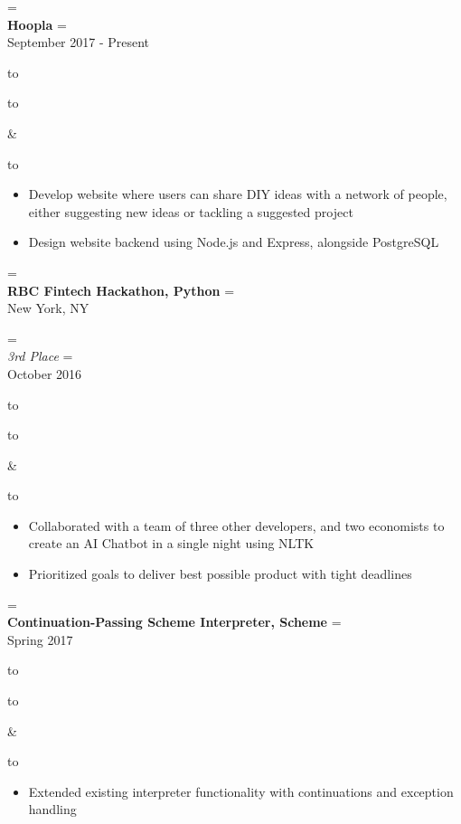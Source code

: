 \documentclass{article}
\newcommand{\appendtotoks}[2]{%
  #1=\expandafter{\the#1#2}%
}
\def\gobble#1{}
\def\gobblefirst#1{%
  #1\expandafter\expandafter\expandafter{\expandafter\gobble\the#1}}
\newcommand{\sectionTitle}[1]{{\Large #1} \vspace{4pt}}
\newenvironment{resumesection}[1]
  {\sectionTitle{#1}}
	{\vspace{10pt}}
\newcommand{\placeStyle}[1]{\textbf{#1}}
\newcommand{\positionStyle}[1]{\textit{#1}}
\newenvironment{newplace}
  {
    \newtoks\leftToks
    \newtoks\rightToks
    \newcommand{\placerow}[2]{%
      \appendtotoks{\leftToks}{\\\placeStyle{##1}}%
      \appendtotoks{\rightToks}{\\##2}}
    \newcommand{\jobrow}[2]{%
      \appendtotoks{\leftToks}{\\\positionStyle{##1}}%
      \appendtotoks{\rightToks}{\\##2}}
    \newcommand{\plainrow}[2]{%
      \appendtotoks{\leftToks}{\\##1}%
      \appendtotoks{\rightToks}{\\##2}}
    \setlength{\tabcolsep}{0pt}%
  }
  {%
    \begin{tabu} to \linewidth [h!]{X[65,l]X[35,r]}
      \begin{tabu} to \linewidth {X}
        \gobblefirst\leftToks
        \the\leftToks
      \end{tabu}
      &
      \begin{tabu} to \linewidth {X[r]}
        \gobblefirst\rightToks
        \the\rightToks
      \end{tabu}
    \end{tabu}%
  }
\newenvironment{bullets}
	{\begin{itemize}[noitemsep, topsep=0pt]}
	{\end{itemize}}
\begin{document}
\begin{resumesection}{Projects}


\begin{newplace}
  \placerow{Hoopla}{September 2017 - Present}
\end{newplace}

\begin{bullets}
  \item Develop website where users can share DIY ideas with a network
        of people, either suggesting new ideas or tackling a suggested
        project 
  \item Design website backend using Node.js and Express, alongside
        PostgreSQL 
\end{bullets}


\begin{newplace}
  \placerow{RBC Fintech Hackathon, Python}
					 {New York, NY}
	\jobrow  {3rd Place}
				   {October 2016}
\end{newplace}

\begin{bullets}
  \item Collaborated with a team of three other developers, and two
        economists to create an AI Chatbot in a single night using
        NLTK
  \item Prioritized goals to deliver best possible product with tight
        deadlines
\end{bullets}


\begin{newplace}
  \placerow{Continuation-Passing Scheme Interpreter, Scheme}
           {Spring 2017}
\end{newplace}

\begin{bullets}
  \item Extended existing interpreter functionality with continuations
        and exception handling
\end{bullets}


\end{resumesection}
\end{document}
